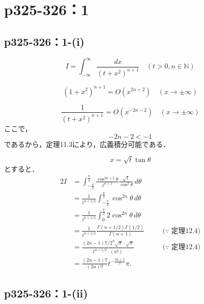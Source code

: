 \documentclass[a4paper,10pt,fleqn]{ltjsarticle}
\begin{document}
    \newpage 


    \section*{p325-326：1}


    \subsection*{p325-326：1-(i)}

\begin{tleftbar}
\[
I = \int_{-\infty}^{\infty} \frac{dx}{(t+x^2)^{n+1}} \quad (t > 0, n \in \mathbb{N})
\]

\[
(1+x^2)^{n+1} = O(x^{2n+2}) \quad (x \to \pm \infty)
\]

\[
\frac{1}{(t+x^2)^{n+1}} = O(x^{-2n-2}) \quad (x \to \pm \infty)
\]
ここで，
\[
-2n-2 < -1
\]
であるから，定理11.3により，広義積分可能である．

\[
x = \sqrt{t} \tan \theta 
\]
とすると．
\begin{alignat*}{2}
I &= \int_{-\frac{\pi}{2}}^{\frac{\pi}{2}} \frac{\cos^{2n+2} \theta}{t^{n+1} } \frac{\sqrt{t}}{\cos^2 \theta} \, d \theta &&\\
&= \frac{1}{t^{n+1/2}} \int_{-\frac{\pi}{2}}^{\frac{\pi}{2}} \cos^{2n} \theta \, d\theta &&\\
& = \frac{1}{t^{n+1/2}} \int_{0}^{\frac{\pi}{2}} 2 \cos^{2n} \theta \, d\theta&&  \\
& = \frac{1}{t^{n+1/2}} \frac{\Gamma (n+1/2) \Gamma (1/2)}{\Gamma(n+1)} & \quad & \text{($\because$~定理12.4)}\\
& = \frac{(2n-1)!! / 2^n \sqrt{\pi} \cdot \sqrt{\pi}}{t^{n+1/2} \cdot (n!)} & \quad & \text{($\because$~定理12.4)}\\\
& = \frac{(2n-1)!!}{(2n)!!} t^{ - \frac{2n+1}{2}} \pi .
\end{alignat*}
\end{tleftbar}


\newpage


\subsection*{p325-326：1-(ii)}
\end{document}
